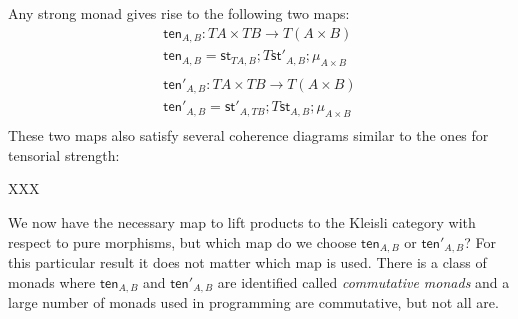 \documentclass{article}
\let\mto\to
\let\to\relax
\newcommand{\to}{\rightarrow}
\begin{document}
Any strong monad gives rise to the following two maps:
\[
\begin{array}{lll}
  \mathsf{ten}_{A,B} : TA \times TB \mto T(A \times B)\\
  \mathsf{ten}_{A,B} = \mathsf{st}_{TA,B};T\mathsf{st}'_{A,B};\mu_{A \times B}\\
  \\
  \mathsf{ten}'_{A,B} : TA \times TB \mto T(A \times B)\\
  \mathsf{ten}'_{A,B} = \mathsf{st'}_{A,TB};T\mathsf{st}_{A,B};\mu_{A \times B}\\
\end{array}
\]
These two maps also satisfy several coherence diagrams similar to the
ones for tensorial strength:
\begin{center}
  XXX
\end{center}

We now have the necessary map to lift products to the Kleisli category
with respect to pure morphisms, but which map do we choose
$\mathsf{ten}_{A,B}$ or $\mathsf{ten}'_{A,B}$?  For this particular
result it does not matter which map is used.  There is a class of
monads where $\mathsf{ten}_{A,B}$ and $\mathsf{ten}'_{A,B}$ are
identified called \emph{commutative monads} and a large number of
monads used in programming are commutative, but not all are.
\end{document}
